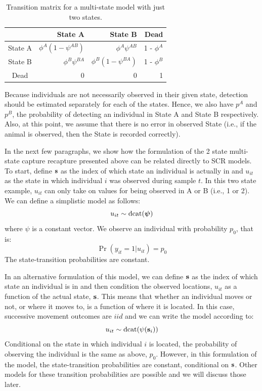 \begin{table}[htb!]
\centering
\caption{
Transition matrix for a multi-state model with just two states.
}
\begin{tabular}{crrr}
\hline \hline
    &   State A &   State B   &   Dead \\  \hline
State A & $\phi^A(1-\psi^{AB})$ & $\phi^A \psi^{AB}$ & 1 - $\phi^A$ \\
State B & $\phi^B \psi^{BA}$ & $\phi^B(1-\psi^{BA})$ & 1 - $\phi^B$ \\
Dead & 0 & 0 & 1\\ \hline
\end{tabular}
\label{open.tab.CJSmulti-matrix}
\end{table}

Because individuals are not necessarily observed in their given state,
detection should be estimated separately for each of the states.
Hence, we also have $p^A$ and $p^B$, the probability of detecting an
individual in State A and State B respectively.  Also, at this point,
we assume that there is no error in observed State (i.e., if the
animal is observed, then the State is recorded correctly).

In the next few paragraphs, we show how the formulation of the 2 state
multi-state capture recapture presented above can be related directly
to SCR models.  To start, define ${\bf s}$ as the index of which state
an individual is actually in and $u_{it}$ as the state in which
individual $i$ was observed during sample $t$.  In this two state
example, $u_{it}$ can only take on values for being observed in A or B
(i.e., 1 or 2).  We can define a simplistic model as follows:
\[
u_{it} \sim  \mathrm{dcat}(\mbox{\boldmath$\psi$})
\]
where $\psi$ is a constant vector.
We observe an individual with probability $p_{0}$, that is:
\[
 \Pr(y_{it} = 1| u_{it} )  = p_{0}
\]
The state-transition probabilities are constant.

In an alternative formulation of this model, we can define ${\bf s}$
as the index of which state an individual is in and then condition the
observed locations, $u_{it}$ as a function of the actual state, ${\bf
  s}$. This means that whether an individual moves or not, or where it
moves to, is a function of where it is located.  In this case,
successive movement outcomes are $iid$ and we can write the model
according to:
\[
u_{it} \sim  \text{dcat}( {\psi}({\bf s}_{i}) )
\]
Conditional on the state in which individual $i$ is located, the
probability of observing the individual is the same as above, $p_{0}$.
However, in this formulation of the model, the state-transition
probabilities are constant, conditional on ${\bf s}$.  Other models
for these transition probabilities are possible and we will discuss
those later.

